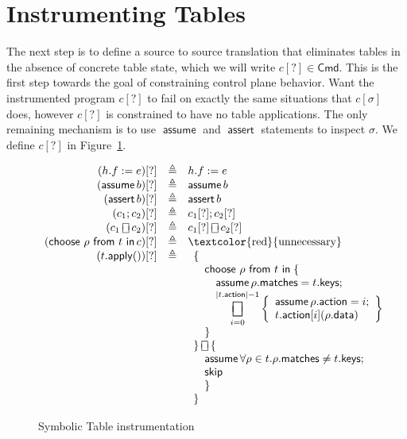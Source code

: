 \documentclass{article}
\newcommand{\Cmd}{\mathsf{Cmd}}
\newcommand{\matches}{\mathsf{matches}}
\newcommand{\action}{\mathsf{action}}
\newcommand{\keys}{\mathsf{keys}}
\newcommand{\data}{\mathsf{data}}
\newcommand{\assert}{\mathop{\mathsf{assert}}}
\newcommand{\assume}{\mathop{\mathsf{assume}}}
\newcommand{\apply}{\mathsf{apply}}
\newcommand{\choiceop}{\rotatebox[origin=c]{90}{$\sqsubset\!\!\!\sqsupset$}}
\newcommand{\choice}{\mathbin{\choiceop}}
\DeclareMathOperator*{\bigchoice}{\scalerel*{\choiceop}{\sum}}
\renewcommand{\choose}[2]{\mathop{\mathsf{choose}~#1~\mathsf{from}~#2~\mathsf{in}}}
\newcommand{\SKIP}{\mathsf{skip}}
\begin{document}
\section{Instrumenting Tables}

The next step is to define a source to source translation that eliminates tables
in the absence of concrete table state, which we will write $c[?] \in \Cmd$.
This is the first step towards the goal of constraining control plane behavior.
Want the instrumented program $c[?]$ to fail on exactly the same situations that
$c[\sigma]$ does, however $c[?]$ is constrained to have no table applications.
The only remaining mechanism is to use $\assume$ and $\assert$ statements to
inspect $\sigma$. We define $c[?]$ in Figure~\ref{fig:table-instrument}.


\begin{figure}[htp]
  \[\begin{array}{r >{\triangleq}cl}
  (h.f := e)[?] && h.f := e \\
  (\assume b)[?] && \assume b \\
  (\assert b)[?] && \assert b\\
  (c_1;c_2)[?] && c_1[?];c_2[?]\\
  (c_1 \choice c_2)[?] && c_1[?] \choice c_2[?]\\
  (\choose \rho t c)[?] &&
  \textrm{\textcolor{red}{unnecessary}} \\
  (t.\apply())[?] &&
  \begin{array}[t]{l} \displaystyle
    \{ \\
    \quad \choose \rho t \;\{ \\
    \qquad \assume \rho.\matches = t.\keys; \\
    \qquad \displaystyle \bigchoice_{i=0}^{|t.\action| -1}
    \left\{\begin{array}{l}
    \assume \rho.\action = i;\\
    t.\action[i](\rho.\data)
    \end{array}\right\}\\
    \quad \} \\
    \} \choice \{ \\
    \quad \assume \forall \rho \in t. \rho.\matches \neq t.\keys; \\
    \quad \SKIP \\
    \quad \}\\
    \}
  \end{array}
  \end{array}
  \]
  \caption{Symbolic Table instrumentation}
  \label{fig:table-instrument}
\end{figure}
\end{document}
